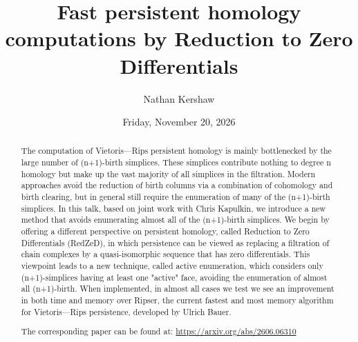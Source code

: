\documentclass{UAmathtalk}
\author{Nathan Kershaw}
\title{Fast persistent homology computations by Reduction to Zero Differentials}
\date{Friday, November 20, 2026}
\begin{document}
\maketitle
\renewcommand*{\abstractsize}{\fontsize{13.5}{16.2}\selectfont}
\begin{abstract}
    {
    The computation of Vietoris—Rips persistent homology is mainly bottlenecked by the large number of (n+1)-birth simplices. These simplices contribute nothing to degree n homology but make up the vast majority of all simplices in the filtration. Modern approaches avoid the reduction of birth columns via a combination of cohomology and birth clearing, but in general still require the enumeration of many of the (n+1)-birth simplices. 
    In this talk, based on joint work with Chris Kapulkin, we introduce a new method that avoids enumerating almost all of the (n+1)-birth simplices. We begin by offering a different perspective on persistent homology, called Reduction to Zero Differentials (RedZeD), in which persistence can be viewed as replacing a filtration of chain complexes by a quasi-isomorphic sequence that has zero differentials. This viewpoint leads to a new technique, called active enumeration, which considers only (n+1)-simplices having at least one "active" face, avoiding the enumeration of almost all (n+1)-birth.
    When implemented, in almost all cases we test we see an improvement in both time and memory over Ripser, the current fastest and most memory algorithm for Vietoris—Rips persistence, developed by Ulrich Bauer.
    
The corresponding paper can be found at: \href{https://arxiv.org/abs/2606.06310}{https://arxiv.org/abs/2606.06310}    }
\end{abstract}
\end{document}

